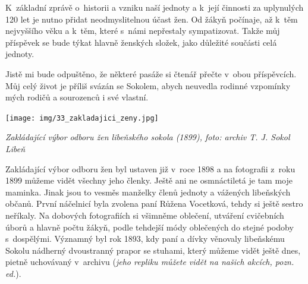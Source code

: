 \documentclass[a5paper, 11pt, twoside]{article}
\begin{document}
K~základní zprávě o~historii a vzniku naší jednoty a k~její činnosti za
uplynulých 120 let je nutno přidat neodmyslitelnou účast žen. Od žákyň
počínaje, až k~těm nejvyššího věku a k~těm, které s~námi nepřestaly
sympatizovat. Takže můj příspěvek se bude týkat hlavně ženských složek,
jako důležité součásti celá jednoty.

Jistě mi bude odpuštěno, že některé pasáže si čtenář přečte v~obou
příspěvcích. Můj celý život je příliš svázán se Sokolem, abych neuvedla
rodinné vzpomínky mých rodičů a sourozenců i své vlastní.

 \texttt{[image: img/33\_zakladajici\_zeny.jpg]}

\textit{Zakládající výbor odboru žen libeňského sokola (1899), foto:
archiv T. J. Sokol Libeň}

Zakládající výbor odboru žen byl ustaven již v~roce 1898 a na fotografii
z~roku 1899 můžeme vidět všechny jeho členky. Ještě ani ne osmnáctiletá
je tam moje maminka. Jinak jsou to vesměs manželky členů jednoty a
vážených libeňských občanů. První náčelnicí byla zvolena paní Růžena
Vocetková, tehdy si ještě sestro neříkaly. Na dobových fotografiích si
všimněme oblečení, utváření cvičebních úborů a hlavně počtu žákyň, podle
tehdejší módy oblečených do stejné podoby s~dospělými. Významný byl rok
1893, kdy paní a dívky věnovaly libeňskému Sokolu nádherný dvoustranný
prapor se stuhami, který můžeme vidět ještě dnes, pietně uchovávaný
v~archivu (\textit{jeho repliku můžete vidět na našich akcích, pozn. ed.}).
\end{document}
